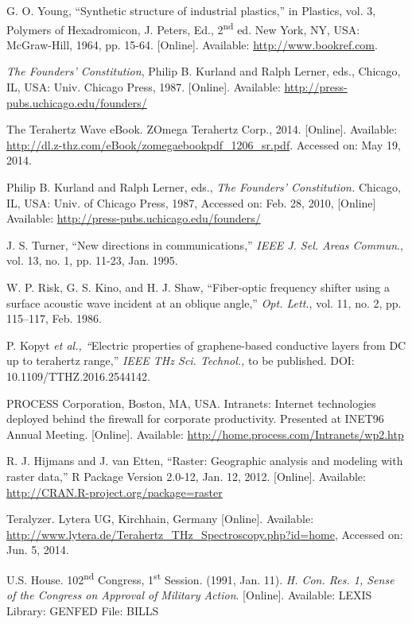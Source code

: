 \documentclass{ieeeaccess}
\begin{document}
\begin{thebibliography}{00}
 G. O. Young, ``Synthetic structure of industrial
plastics,'' in Plastics, vol. 3, Polymers of Hexadromicon, J. Peters,
Ed., 2\textsuperscript{nd} ed. New York, NY, USA: McGraw-Hill, 1964, pp. 15-64.
[Online]. Available:
\underline{http://www.bookref.com}.

 \emph{The Founders' Constitution}, Philip B. Kurland
and Ralph Lerner, eds., Chicago, IL, USA: Univ. Chicago Press, 1987.
[Online]. Available: \underline{http://press-pubs.uchicago.edu/founders/}

 The Terahertz Wave eBook. ZOmega Terahertz Corp., 2014.
[Online]. Available:
\underline{http://dl.z-thz.com/eBook/zomegaebookpdf\_1206\_sr.pdf}. Accessed on: May 19, 2014.

 Philip B. Kurland and Ralph Lerner, eds., \emph{The
Founders' Constitution.} Chicago, IL, USA: Univ. of Chicago Press,
1987, Accessed on: Feb. 28, 2010, [Online] Available:
\underline{http://press-pubs.uchicago.edu/founders/}

 J. S. Turner, ``New directions in communications,'' \emph{IEEE J. Sel. Areas Commun}., vol. 13, no. 1, pp. 11-23, Jan. 1995.

 W. P. Risk, G. S. Kino, and H. J. Shaw, ``Fiber-optic frequency shifter using a surface acoustic wave incident at an oblique angle,'' \emph{Opt. Lett.}, vol. 11, no. 2, pp. 115--117, Feb. 1986.

 P. Kopyt \emph{et al., ``}Electric properties of graphene-based conductive layers from DC up to terahertz range,'' \emph{IEEE THz Sci. Technol.,} to be published. DOI: 10.1109/TTHZ.2016.2544142.

 PROCESS Corporation, Boston, MA, USA. Intranets:
Internet technologies deployed behind the firewall for corporate
productivity. Presented at INET96 Annual Meeting. [Online].
Available: \underline{http://home.process.com/Intranets/wp2.htp}

 R. J. Hijmans and J. van Etten, ``Raster: Geographic analysis and modeling with raster data,'' R Package Version 2.0-12, Jan. 12, 2012. [Online]. Available: \underline {http://CRAN.R-project.org/package=raster}

 Teralyzer. Lytera UG, Kirchhain, Germany [Online].
Available:
\underline{http://www.lytera.de/Terahertz\_THz\_Spectroscopy.php?id=home}, Accessed on: Jun. 5, 2014.

 U.S. House. 102\textsuperscript{nd} Congress, 1\textsuperscript{st} Session. (1991, Jan. 11). \emph{H. Con. Res. 1, Sense of the Congress on Approval of}  \emph{Military Action}. [Online]. Available: LEXIS Library: GENFED File: BILLS


\end{thebibliography}
\end{document}
